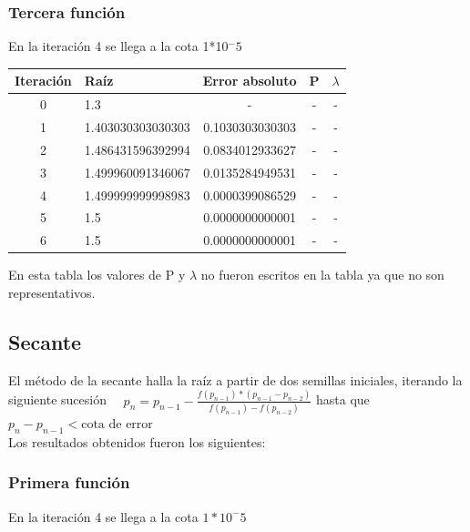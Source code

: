 \documentclass[titlepage,a4paper]{article}
\begin{document}
\subsubsection{Tercera función}\label{sec:NRM3}
En la iteración 4 se llega a la cota 1*10$^-5$
\begin{center}
\begin{tabular}{| c | l | c | c | c |}
    \hline
        Iteración & Raíz & Error absoluto & P & $\lambda$ \\ \hline
0      & 1.3  &  -  &  -  &  - \\
1      & 1.403030303030303  &  0.1030303030303  &  -  &  - \\   %
2      & 1.486431596392994  &  0.0834012933627  &  -  &  - \\
3      & 1.499960091346067  &  0.0135284949531  &  -  &  - \\
4      & 1.499999999998983  &  0.0000399086529  &  -  &  - \\
5      & 1.5  &  0.0000000000001 & - & - \\
6      & 1.5  &  0.0000000000001 & - & - \\
    \hline
    \end{tabular}
\end{center}
En esta tabla los valores de P y $\lambda$ no fueron escritos en la tabla ya que no son representativos.\\

\subsection{Secante}\label{sec:secante}
El método de la secante halla la raíz a partir de dos semillas iniciales, iterando la siguiente sucesión
$\quad p_{n} =p_{n-1}-\frac{f (p_{n-1})*(p_{n-1}-p_{n-2})}{f(p_{n-1})-f(p_{n-2})}$ hasta que $p_{n}-p_{n-1} < \mbox{cota de error}$
\\

Los resultados obtenidos fueron los siguientes:
\newpage
\subsubsection{Primera función}\label{sec:sec1}

En la iteración 4 se llega a la cota $1*10^-5$
\end{document}
